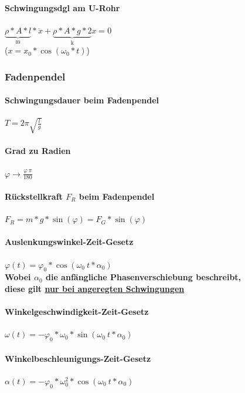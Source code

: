 \documentclass[12pt, a4paper]{scrreprt}
\begin{document}
\paragraph{Schwingungsdgl am U-Rohr} \dotfill \(\underbrace{\rho*A*l}_\text{m}*\ddot x+\underbrace{\rho*A*g*2}_\text{k}x=0\)\\
(\(x=x_0*\cos(\omega_0*t)\))

\subsubsection{Fadenpendel}

\paragraph{Schwingungsdauer beim Fadenpendel} \dotfill \(T = 2\pi \sqrt{\frac{l}{g}}\)
\paragraph{Grad zu Radien} \dotfill \(\varphi \rightarrow \frac{\varphi\ \pi}{180}\)

\paragraph{Rückstellkraft \(F_R\) beim Fadenpendel} \dotfill \(F_R = m * g * \sin (\varphi) = F_G * \sin(\varphi)\)
\paragraph{Auslenkungswinkel-Zeit-Gesetz} \dotfill \(\varphi(t) = \varphi_0 * \cos (\omega_0\ t * \alpha_0)\)\\[1em]
\myhspace{} \textbf{Wobei \(\alpha_0\) die anfängliche Phasenverschiebung beschreibt,\\
  diese gilt \underline{nur bei angeregten Schwingungen}}
\paragraph{Winkelgeschwindigkeit-Zeit-Gesetz} \dotfill \(\omega(t) = -\varphi_0 * \omega_0 * \sin (\omega_0\ t * \alpha_0)\)\\
\paragraph{Winkelbeschleunigungs-Zeit-Gesetz} \dotfill \(\alpha(t) = -\varphi_0 * \omega_0^2 * \cos (\omega_0\ t * \alpha_0)\)\\
\end{document}

